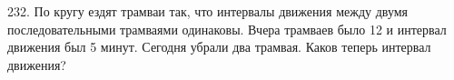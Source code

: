 232. По кругу ездят трамваи так, что интервалы движения между двумя последовательными трамваями одинаковы. Вчера трамваев было 12 и интервал движения был 5 минут. Сегодня убрали два трамвая. Каков теперь интервал движения?\\
